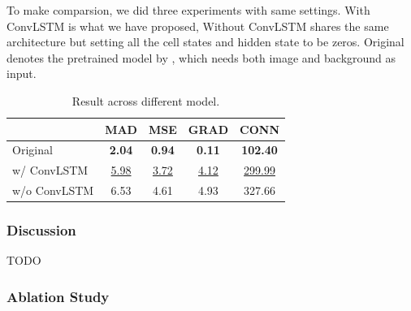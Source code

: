 \documentclass[final]{cvpr}
\begin{document}
To make comparsion, we did three experiments with same settings.
With ConvLSTM is what we have proposed, Without ConvLSTM shares the same architecture but setting all the cell states and hidden state to be zeros. Original denotes the pretrained model by \cite{linRealTimeHighResolutionBackground2020a}, which needs both image and background as input.

\begin{table}[htb]
    \centering
    \caption{Result across different model.}
    \label{result}
    \begin{tabular}{lcccc}
        \toprule
        {}           & MAD              & MSE              & GRAD             & CONN               \\
        \midrule
        Original     & \textbf{2.04}    & \textbf{0.94}    & \textbf{0.11}    & \textbf{102.40}    \\
        \midrule
        w/ ConvLSTM  & \underline{5.98} & \underline{3.72} & \underline{4.12} & \underline{299.99} \\
        w/o ConvLSTM & 6.53             & 4.61             & 4.93             & 327.66             \\
        \bottomrule
    \end{tabular}
\end{table}

\subsubsection{Discussion}

TODO

\subsubsection{Ablation Study}
\end{document}
